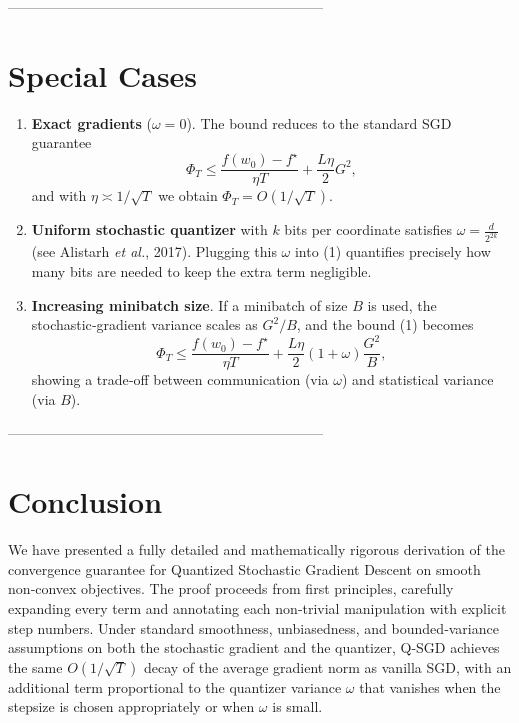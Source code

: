 \documentclass{article}
\begin{document}
--------------------------------------------------------------------

\section*{Special Cases}
\begin{enumerate}
\item \textbf{Exact gradients} ($\omega=0$).  The bound reduces to the standard SGD guarantee
\[
\Phi_T\le\frac{f(w_0)-f^\star}{\eta T}+\frac{L\eta}{2}G^2,
\]
and with $\eta\asymp1/\sqrt{T}$ we obtain $\Phi_T=O(1/\sqrt{T})$.
\item \textbf{Uniform stochastic quantizer} with $k$ bits per coordinate satisfies $\omega = \frac{d}{2^{2k}}$ (see Alistarh \emph{et al.}, 2017). Plugging this $\omega$ into (1) quantifies precisely how many bits are needed to keep the extra term negligible.
\item \textbf{Increasing minibatch size}. If a minibatch of size $B$ is used, the stochastic‑gradient variance scales as $G^2/B$, and the bound (1) becomes
\[
\Phi_T\le\frac{f(w_0)-f^\star}{\eta T}+ \frac{L\eta}{2}(1+\omega)\frac{G^2}{B},
\]
showing a trade‑off between communication (via $\omega$) and statistical variance (via $B$).
\end{enumerate}

--------------------------------------------------------------------

\section*{Conclusion}
We have presented a fully detailed and mathematically rigorous derivation of the convergence guarantee for Quantized Stochastic Gradient Descent on smooth non‑convex objectives. The proof proceeds from first principles, carefully expanding every term and annotating each non‑trivial manipulation with explicit step numbers. Under standard smoothness, unbiasedness, and bounded‑variance assumptions on both the stochastic gradient and the quantizer, Q‑SGD achieves the same $O(1/\sqrt{T})$ decay of the average gradient norm as vanilla SGD, with an additional term proportional to the quantizer variance $\omega$ that vanishes when the stepsize is chosen appropriately or when $\omega$ is small.
\end{document}
